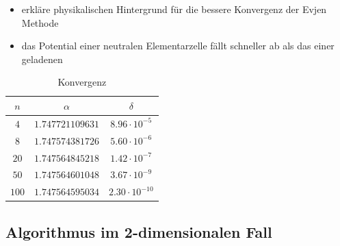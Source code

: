 \documentclass[10pt,a4paper]{article}
\begin{document}
\begin{itemize}
\item erkläre physikalischen Hintergrund für die bessere Konvergenz der Evjen
Methode
\item das Potential einer neutralen Elementarzelle fällt schneller ab als das
einer geladenen
\end{itemize}

\begin{table}[h]
\centering
\begin{tabular}{c|c|c}
\rule[-1ex]{0pt}{2.5ex} $n$ & $\alpha$ & $\delta$ \\ 
\hline 
\rule[-1ex]{0pt}{2.5ex} $4$ & $1.747721109631$ & $8.96\cdot10^{-5}$ \\ 
\hline 
\rule[-1ex]{0pt}{2.5ex} $8$ & $1.747574381726$ & $5.60\cdot10^{-6}$ \\ 
\hline 
\rule[-1ex]{0pt}{2.5ex} $20$ & $1.747564845218$ & $1.42\cdot10^{-7}$ \\ 
\hline 
\rule[-1ex]{0pt}{2.5ex} $50$ & $1.747564601048$ & $3.67\cdot10^{-9}$ \\ 
\hline 
\rule[-1ex]{0pt}{2.5ex} $100$ & $1.747564595034$ & $2.30\cdot10^{-10}$ \\ 
\end{tabular} 
\caption{Konvergenz}
\end{table}

\subsection{Algorithmus im 2-dimensionalen Fall}
\end{document}
